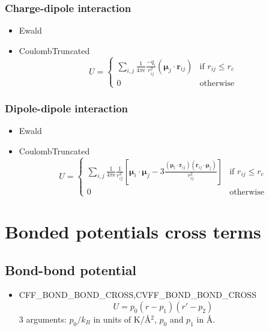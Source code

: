 \subsubsection{Charge-dipole interaction}

\begin{itemize}
\item{Ewald}\\
\item{CoulombTruncated}
\begin{equation}
 U=\begin{cases}
    \sum_{i,j} \frac{1}{4\pi\epsilon} \frac{-q_i}{r^2_{ij}}
      \left({\boldsymbol \mu}_j\cdot\mathbf{r}_{ij}\right)& \text{if }r_{ij}\leq r_c\\
    0 & \text{otherwise}
   \end{cases}
\end{equation}
\end{itemize}


\subsubsection{Dipole-dipole interaction}

\begin{itemize}
\item{Ewald}\\
\item{CoulombTruncated}
\begin{equation}
 U=\begin{cases}
    \sum_{i,j} \frac{1}{4\pi\epsilon}\frac{1}{r^3_{ij}}
    \left[{\boldsymbol \mu}_i\cdot {\boldsymbol \mu}_j-3\frac{\left({\boldsymbol\mu}_i\cdot\mathbf{r}_{ij}\right)
    \left(\mathbf{r}_{ij}\cdot{\boldsymbol \mu}_j\right)}{r^2_{ij}}\right]& \text{if }r_{ij}\leq r_c\\
    0 & \text{otherwise}
   \end{cases}
\end{equation}
\end{itemize}


\section{Bonded potentials cross terms}

\subsection{Bond-bond potential}

\begin{itemize}
  \item{CFF\_BOND\_BOND\_CROSS,CVFF\_BOND\_BOND\_CROSS}\\
  \begin{equation}
  U=p_0\left(r-p_1\right)\left(r'-p_2\right)
  \end{equation}
  3 arguments: $p_0/k_B$ in units of K/\AA$^2$, $p_0$ and $p_1$ in \AA.
\end{itemize}


